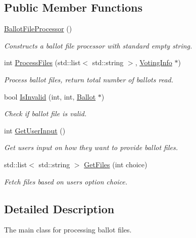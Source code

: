 \subsection*{Public Member Functions}
\begin{DoxyCompactItemize}
\item 
\hyperlink{classBallotFileProcessor_ad199c2e246c3a0baf2d6a99e4ddcf144}{Ballot\+File\+Processor} ()
\begin{DoxyCompactList}\small\item\em Constructs a ballot file processor with standard empty string. \end{DoxyCompactList}\item 
int \hyperlink{classBallotFileProcessor_a32053d65ec327ae34713d757b66a7afb}{Process\+Files} (std\+::list$<$ std\+::string $>$, \hyperlink{classVotingInfo}{Voting\+Info} $\ast$)
\begin{DoxyCompactList}\small\item\em Process ballot files, return total number of ballots read. \end{DoxyCompactList}\item 
bool \hyperlink{classBallotFileProcessor_ab5fa519ae4703ac435535242070902b9}{Is\+Invalid} (int, int, \hyperlink{classBallot}{Ballot} $\ast$)
\begin{DoxyCompactList}\small\item\em Check if ballot file is valid. \end{DoxyCompactList}\item 
int \hyperlink{classBallotFileProcessor_a2a14b51d82b1873d576fe51ef861701f}{Get\+User\+Input} ()
\begin{DoxyCompactList}\small\item\em Get user\textquotesingle{}s input on how they want to provide ballot files. \end{DoxyCompactList}\item 
std\+::list$<$ std\+::string $>$ \hyperlink{classBallotFileProcessor_a23b892165d81f5b5441733ca49a30cd5}{Get\+Files} (int choice)
\begin{DoxyCompactList}\small\item\em Fetch files based on user\textquotesingle{}s option choice. \end{DoxyCompactList}\end{DoxyCompactItemize}


\subsection{Detailed Description}
The main class for processing ballot files. 

